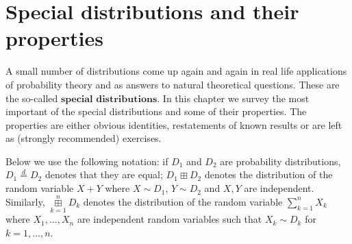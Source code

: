 \chapter{Special distributions and their properties}

A small number of distributions come up again and
again in real life applications of probability theory
and as answers to natural theoretical questions. These
are the so-called $\textbf{special distributions}$.
In this chapter we survey the most important of the
special distributions and some of their properties.
The properties are either obvious identities,
restatements of known results or are left as (strongly
recommended) exercises.

Below we use the following notation: if $D_1$ and
$D_2$ are probability distributions,
$D_1 \stackrel{d}{=} D_2$ denotes that they are
equal; $D_1\boxplus D_2$ denotes the distribution of
the random variable $X+Y$ where $X\sim D_1$,
$Y\sim D_2$ and $X,Y$ are independent. Similarly,
$\mathop{\boxplus}\limits_{k=1}^n D_k$ denotes the
distribution of the random variable $\sum_{k=1}^n X_k$
where $X_1,\ldots,X_n$ are independent random
variables such that $X_k \sim D_k$ for $k=1,\ldots,n$.





















